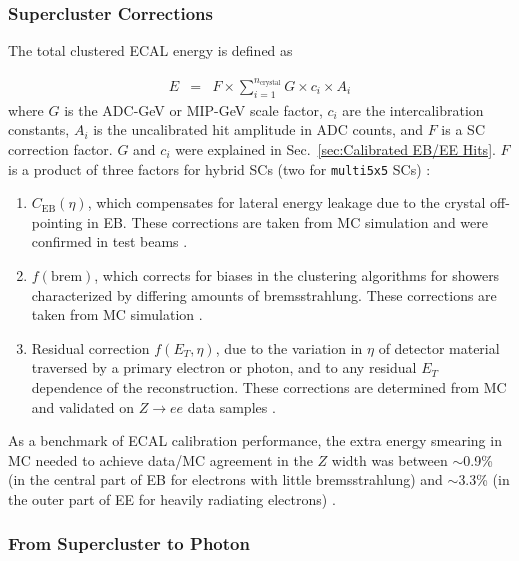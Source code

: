 \documentclass[dissertation.tex]{subfiles}
\begin{document}
\subsubsection{Supercluster Corrections}
\label{sec:Supercluster Corrections}

The total clustered ECAL energy is defined as

\begin{eqnarray}
E &=& F \times \sum_{i=1}^{n_{\mathrm{crystal}}} G \times c_{i} \times A_{i}
\end{eqnarray}
%
where $G$ is the ADC-GeV or MIP-GeV scale factor, $c_{i}$ are the intercalibration constants, $A_{i}$ is the uncalibrated hit amplitude in ADC counts, and $F$ is a SC correction factor.  $G$ and $c_{i}$ were explained in Sec.~\ref{sec:Calibrated EB/EE Hits}.  $F$ is a product of three factors for hybrid SCs (two for \verb+multi5x5+ SCs) \cite{ECAL_SC_note}:

\begin{enumerate}
  \item $C_{\mathrm{EB}}(\eta)$, which compensates for lateral energy leakage due to the crystal off-pointing in EB.  These corrections are taken from MC simulation \cite{ECAL_SC_note} and were confirmed in test beams \cite{EB_startup_intercalibration}.
  \item $f(\mbox{brem})$, which corrects for biases in the clustering algorithms for showers characterized by differing amounts of bremsstrahlung.  These corrections are taken from MC simulation \cite{ECAL_SC_note}.
  \item Residual correction $f(E_{T}, \eta)$, due to the variation in $\eta$ of detector material traversed by a primary electron or photon, and to any residual $E_{T}$ dependence of the reconstruction.  These corrections are determined from MC and validated on $Z\rightarrow ee$ data samples \cite{ECALEnergyScaleCorrections_Twiki}.\marginpar{\textcolor{blue}{Changed}}
\end{enumerate}

As a benchmark of ECAL calibration performance, the extra energy smearing in MC needed to achieve data/MC agreement in the $Z$ width was between $\sim$0.9\% (in the central part of EB for electrons with little bremsstrahlung) and $\sim$3.3\% (in the outer part of EE for heavily radiating electrons) \cite{Higgs_note}.

\subsubsection{From Supercluster to Photon}
\label{sec:From Supercluster to Photon}
\end{document}
